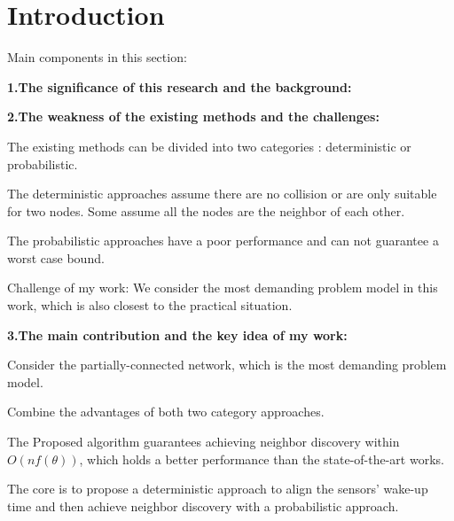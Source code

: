 \section{Introduction}

Main components in this section:

\textbf{1.The significance of this research and the background:}
\vspace{3mm}

\textbf{2.The weakness of the existing methods and the challenges:}

The existing methods can be divided into two categories :  deterministic or probabilistic.

The deterministic approaches assume there are no collision or are only suitable for two nodes.
Some assume all the nodes are the neighbor of each other.

The probabilistic approaches have a poor performance and can not guarantee a worst case bound. 


Challenge of my work:
We consider the most demanding problem model in this work, which is also closest to the practical situation.

\textbf{3.The main contribution and the key idea of my work:}

Consider the partially-connected network, which is the most demanding problem model.

Combine the advantages of both two category approaches.

The Proposed algorithm guarantees achieving neighbor discovery within $O(nf(\theta))$, which holds a better
performance than the state-of-the-art works.

The core is to propose a deterministic approach to  align the sensors' wake-up time and then achieve neighbor discovery with a probabilistic approach.




